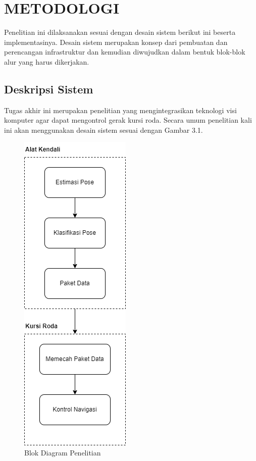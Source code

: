 \chapter{METODOLOGI}
\label{chap:metodologi}


Penelitian ini dilaksanakan sesuai dengan desain sistem berikut ini beserta implementasinya. Desain sistem merupakan konsep dari pembuatan dan perencangan infrastruktur dan kemudian diwujudkan dalam bentuk blok-blok alur yang harus dikerjakan.

\section{Deskripsi Sistem}
\label{sec:deskripsisistem}

Tugas akhir ini merupakan penelitian yang mengintegrasikan teknologi visi komputer agar dapat mengontrol gerak kursi roda. Secara umum penelitian kali ini akan menggunakan desain sistem sesuai dengan Gambar 3.1.

\begin{figure} [ht] \centering
    \includegraphics[scale=0.68]{gambar/blokDiagram.png}
    \caption{Blok Diagram Penelitian}
    \label{fig:Metodologi Penelitian}
\end{figure}

